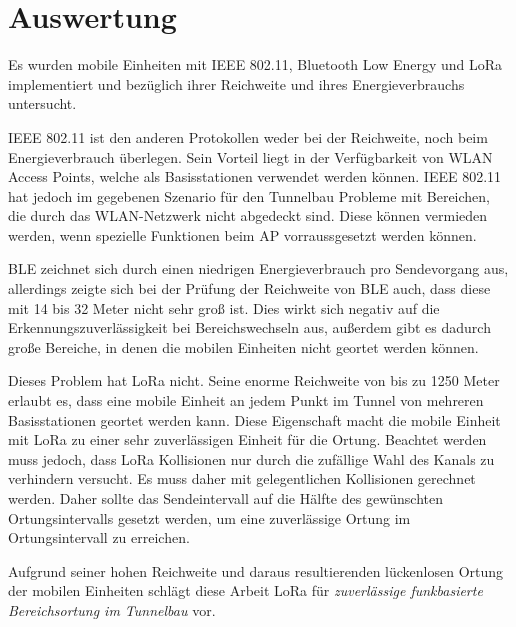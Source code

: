 \section{Auswertung}
Es wurden mobile Einheiten mit IEEE 802.11, Bluetooth Low Energy und LoRa implementiert und bezüglich ihrer Reichweite und ihres Energieverbrauchs untersucht.

IEEE 802.11 ist den anderen Protokollen weder bei der Reichweite, noch beim Energieverbrauch überlegen. 
Sein Vorteil liegt in der Verfügbarkeit von WLAN Access Points, welche als Basisstationen verwendet werden können.
IEEE 802.11 hat jedoch im gegebenen Szenario für den Tunnelbau Probleme mit Bereichen, die durch das WLAN-Netzwerk nicht abgedeckt sind. 
Diese können vermieden werden, wenn spezielle Funktionen beim AP vorraussgesetzt werden können.

BLE zeichnet sich durch einen niedrigen Energieverbrauch pro Sendevorgang aus, allerdings zeigte sich bei der Prüfung der Reichweite von BLE auch, dass diese mit 14 bis 32 Meter nicht sehr groß ist.
Dies wirkt sich negativ auf die Erkennungszuverlässigkeit bei Bereichswechseln aus, außerdem gibt es dadurch große Bereiche, in denen die mobilen Einheiten nicht geortet werden können.

Dieses Problem hat LoRa nicht. 
Seine enorme Reichweite von bis zu 1250 Meter erlaubt es, dass eine mobile Einheit an jedem Punkt im Tunnel von mehreren Basisstationen geortet werden kann.
Diese Eigenschaft macht die mobile Einheit mit LoRa zu einer sehr zuverlässigen Einheit für die Ortung.
Beachtet werden muss jedoch, dass LoRa Kollisionen nur durch die zufällige Wahl des Kanals zu verhindern versucht.
Es muss daher mit gelegentlichen Kollisionen gerechnet werden.
Daher sollte das Sendeintervall auf die Hälfte des gewünschten Ortungsintervalls gesetzt werden, um eine zuverlässige Ortung im Ortungsintervall zu erreichen.

Aufgrund seiner hohen Reichweite und daraus resultierenden lückenlosen Ortung der mobilen Einheiten schlägt diese Arbeit LoRa für \emph{zuverlässige funkbasierte Bereichsortung im Tunnelbau} vor.





